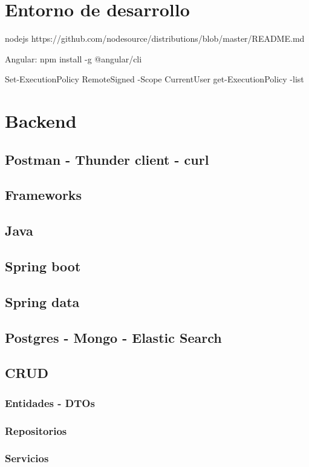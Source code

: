 \section{Entorno de desarrollo}

nodejs
https://github.com/nodesource/distributions/blob/master/README.md

Angular: npm install -g @angular/cli

Set-ExecutionPolicy RemoteSigned -Scope CurrentUser
get-ExecutionPolicy -list

\section{Backend}
\subsection{Postman - Thunder client - curl}
\subsection{Frameworks}
\subsection{Java}
\subsection{Spring boot}
\subsection{Spring data}
\subsection{Postgres - Mongo - Elastic Search}
\subsection{CRUD}
\subsubsection{Entidades - DTOs}
\subsubsection{Repositorios}
\subsubsection{Servicios}
